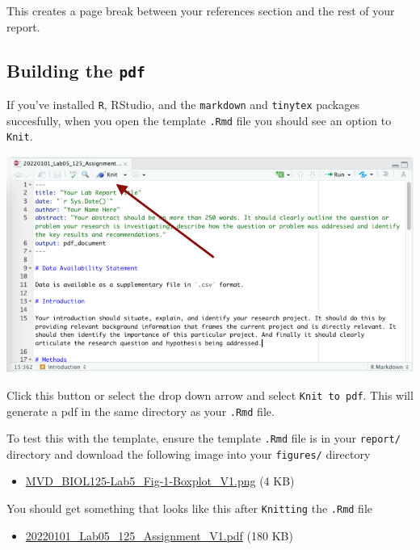 \documentclass[
]{book}
\providecommand{\tightlist}{%
  \setlength{\itemsep}{0pt}\setlength{\parskip}{0pt}}
\begin{document}
This creates a page break between your references section and the rest of your report.

\hypertarget{building-the-pdf}{%
\subsection*{\texorpdfstring{Building the \texttt{pdf}}{Building the pdf}}\label{building-the-pdf}}

If you've installed \texttt{R}, RStudio, and the \texttt{markdown} and \texttt{tinytex} packages succesfully, when you open the template \texttt{.Rmd} file you should see an option to \texttt{Knit}.

\includegraphics{images/Knit_20220101.png}

Click this button or select the drop down arrow and select \texttt{Knit\ to\ pdf}. This will generate a pdf in the same directory as your \texttt{.Rmd} file.

To test this with the template, ensure the template \texttt{.Rmd} file is in your \texttt{report/} directory and download the following image into your \texttt{figures/} directory

\begin{itemize}
\tightlist
\item
  \href{https://osf.io/download/zuehg}{MVD\_BIOL125-Lab5\_Fig-1-Boxplot\_V1.png} (4 KB)
\end{itemize}

You should get something that looks like this after \texttt{Knitting} the \texttt{.Rmd} file

\begin{itemize}
\tightlist
\item
  \href{https://osf.io/download/3k8ve}{20220101\_Lab05\_125\_Assignment\_V1.pdf} (180 KB)
\end{itemize}
\end{document}
